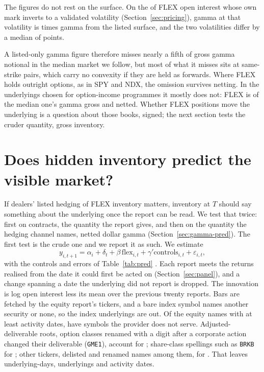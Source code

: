 \documentclass[11pt]{article}
\begin{document}
The figures do not rest on the surface. On the \GammaMarkShare{} of FLEX open interest
whose own mark inverts to a validated volatility (Section~\ref{sec:pricing}), gamma at
that volatility is \GammaMarkRatio{} times gamma from the listed surface, and the two
volatilities differ by a median of \GammaMarkVolGap{} points.

A listed-only gamma figure therefore misses nearly a fifth of gross gamma notional in the median
market we follow, but most of what it misses sits at same-strike pairs, which carry no
convexity if they are held as forwards.
Where FLEX holds outright options, as in SPY and NDX, the omission survives netting. In
the \GammaProgrammeCount{} underlyings chosen for option-income programmes it mostly does not:
FLEX is \GammaProgrammeGross{} of the median one's gamma gross and \GammaProgrammeNetted{}
netted. Whether FLEX positions move the
underlying is a question about those books, signed; the next section tests the cruder
quantity, gross inventory.

\section{Does hidden inventory predict the visible market?}
\label{sec:predict}

If dealers' listed hedging of FLEX inventory matters, inventory at $T$ should say
something about the underlying once the report can be read. We test that twice: first on
contracts, the quantity the report gives, and then on the quantity the hedging channel
names, netted dollar gamma (Section~\ref{sec:gamma-pred}). The first test is the
crude one and we report it as such. We estimate
\begin{equation}
y_{i,t+1}
= \alpha_i + \delta_t
+ \beta\,\text{flex}_{i,t}
+ \gamma' \text{controls}_{i,t}
+ \varepsilon_{i,t},
\label{eq:pred}
\end{equation}
with the controls and errors of Table~\ref{tab:pred} \citep{cameron2011}. Each report meets
the returns realised from the date it could first be acted on (Section~\ref{sec:panel}),
and a change spanning a date the underlying did not report is dropped. The innovation is
log open interest less its mean over the previous twenty reports. Bars are fetched by the
equity report's tickers, and a bare index symbol names another security or none, so the
\PredIndexUnderlyings{} index underlyings are out. Of the \PredQualifying{} equity names
with at least \PredQualifyingDates{} activity dates, \PredNoBars{} have symbols the
provider does not serve. Adjusted-deliverable roots, option classes renamed with a digit
after a corporate action changed their deliverable (\texttt{GME1}), account for
\PredNoBarsAdjusted{}; share-class spellings such as \texttt{BRKB} for
\PredNoBarsShareClass{}; other tickers, delisted and renamed names among them, for
\PredNoBarsOther{}. That leaves \PredUnderlyingDays{}
underlying-days, \PredUnderlyings{} underlyings and \PredDates{} activity dates.
\end{document}
